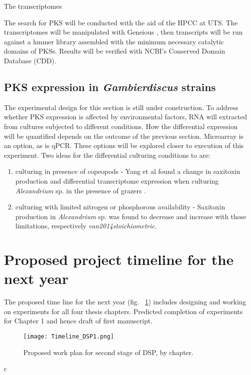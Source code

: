 \documentclass[12pt]{article}
\begin{document}
The transcriptomes 

The search for PKS will be conducted with the aid of the HPCC at UTS. The transcriptomes will be manipulated with Geneious \cite{kearse2012geneious}, then transcripts will be run against a hmmer library assembled with the minimum necessary catalytic domains of PKSs. Results will be verified with NCBI's Conserved Domain Database (CDD).

\subsection{PKS expression in \emph{Gambierdiscus} strains}
The experimental design for this section is still under construction. To address whether PKS expression is affected by environmental factors, RNA will extracted from cultures subjected to different conditions. How the differential expression will be quantified depends on the outcome of the previous section. Microarray is an option, as is qPCR. These options will be explored closer to execution of this experiment.
Two ideas for the differential culturing conditions to are: 
\begin{enumerate}
\item culturing in presence of copeopods - Yang et al found a change in saxitoxin production and differential transcriptome expression when culturing \emph{Alexandrium} sp. in the presence of grazers \cite{yang2011grazer}.
\item culturing with limited nitrogen or phosphorous availability - Saxitoxin production in \emph{Alexandrium} sp. was found to decrease and increase with those limitations, respectively \emph{van2014stoichiometric}.
\end{enumerate}


\section{Proposed project timeline for the next year} 
The proposed time line for the next year (fig. ~\ref{fig:timeline}) includes designing and working on experiments for all four thesis chapters. Predicted completion of experiments for Chapter 1 and hence draft of first manuscript.
\FloatBarrier
\begin{figure} 
\texttt{[image: Timeline\_DSP1.png]} 
\caption{Proposed work plan for second stage of DSP, by chapter.} 
\label{fig:timeline}
\end{figure} 
\FloatBarrier 
c


\newpage


\end{document}
